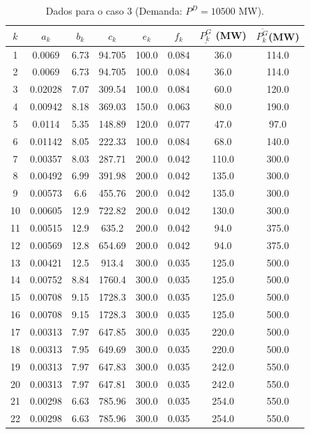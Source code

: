 \documentclass[
	12pt,				%
	openany,			%
	twoside,			%
	a4paper,			%
	chapter=TITLE,		%
	section=Title,		%
	subsection=Title,	%
	subsubsection=Title,%
	english,			%
	french,				%
	spanish,			%
	brazil			%
	]{abntex2}
\begin{document}
\begin{ERRATA}
\begin{apendicesenv}
\begin{table}[h!]
\caption{\label{40coef}Dados para o caso 3 (Demanda: $P^D=10500$ MW).}
\center
\begin{tabular}{c c c c c c c c}
\hline
 $k$  & $a_k$       & $b_k$    & $c_k$     & $e_k$     & $f_k$     & $\underline{P^G_k}$ (MW)    & $\overline{P^G_k} $(MW)  \\
 \hline
1  & 0.0069  & 6.73 & 94.705 & 100.0 & 0.084 & 36.0  & 114.0 \\
2  & 0.0069  & 6.73 & 94.705 & 100.0 & 0.084 & 36.0  & 114.0 \\
3  & 0.02028 & 7.07 & 309.54 & 100.0 & 0.084 & 60.0  & 120.0 \\
4  & 0.00942 & 8.18 & 369.03 & 150.0 & 0.063 & 80.0  & 190.0 \\
5  & 0.0114  & 5.35 & 148.89 & 120.0 & 0.077 & 47.0  & 97.0  \\
6  & 0.01142 & 8.05 & 222.33 & 100.0 & 0.084 & 68.0  & 140.0 \\
7  & 0.00357 & 8.03 & 287.71 & 200.0 & 0.042 & 110.0 & 300.0 \\
8  & 0.00492 & 6.99 & 391.98 & 200.0 & 0.042 & 135.0 & 300.0 \\
9  & 0.00573 & 6.6  & 455.76 & 200.0 & 0.042 & 135.0 & 300.0 \\
10  & 0.00605 & 12.9 & 722.82 & 200.0 & 0.042 & 130.0 & 300.0 \\
11 & 0.00515 & 12.9 & 635.2  & 200.0 & 0.042 & 94.0  & 375.0 \\
12 & 0.00569 & 12.8 & 654.69 & 200.0 & 0.042 & 94.0  & 375.0 \\
13 & 0.00421 & 12.5 & 913.4  & 300.0 & 0.035 & 125.0 & 500.0 \\
14 & 0.00752 & 8.84 & 1760.4 & 300.0 & 0.035 & 125.0 & 500.0 \\
15 & 0.00708 & 9.15 & 1728.3 & 300.0 & 0.035 & 125.0 & 500.0 \\
16 & 0.00708 & 9.15 & 1728.3 & 300.0 & 0.035 & 125.0 & 500.0 \\
17 & 0.00313 & 7.97 & 647.85 & 300.0 & 0.035 & 220.0 & 500.0 \\
18 & 0.00313 & 7.95 & 649.69 & 300.0 & 0.035 & 220.0 & 500.0 \\
19 & 0.00313 & 7.97 & 647.83 & 300.0 & 0.035 & 242.0 & 550.0 \\
20 & 0.00313 & 7.97 & 647.81 & 300.0 & 0.035 & 242.0 & 550.0 \\
21 & 0.00298 & 6.63 & 785.96 & 300.0 & 0.035 & 254.0 & 550.0 \\
22 & 0.00298 & 6.63 & 785.96 & 300.0 & 0.035 & 254.0 & 550.0 \\

\end{tabular}
\end{table}
\end{apendicesenv}
\end{ERRATA}
\end{document}
